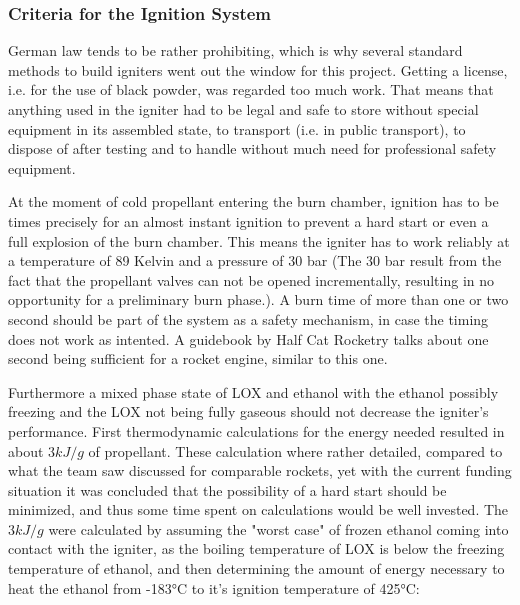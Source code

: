        \subsubsection{Criteria for the Ignition System}
        German law tends to be rather prohibiting, which is why several standard methods to build igniters went out the window for this project. Getting a license, i.e. for the use of black powder, was regarded too much work. %
        That means that anything used in the igniter had to be legal and safe to store without special equipment in its assembled state, to transport (i.e. in public transport), to dispose of after testing and to handle without much need for professional safety equipment. \par
        At the moment of cold propellant entering the burn chamber, ignition has to be times precisely for an almost instant ignition to prevent a hard start or even a full explosion of the burn chamber. This means the igniter has to work reliably at a temperature of 89 Kelvin and a pressure of 30 bar (The 30 bar result from the fact that the propellant valves can not be opened incrementally, resulting in no opportunity for a preliminary burn phase.). A burn time of more than one or two second should be part of the system as a safety mechanism, in case the timing does not work as intented. A guidebook by Half Cat Rocketry talks about one second being sufficient for a rocket engine, similar to this one. \cite[63]{mojave_sphinx}\par
        Furthermore a mixed phase state of LOX and ethanol with the ethanol possibly freezing and the LOX not being fully gaseous should not decrease the igniter’s performance. First thermodynamic calculations for the energy needed resulted in about $3 kJ/g$ of propellant. These calculation where rather detailed, compared to what the team saw discussed for comparable rockets, yet with the current funding situation it was concluded that the possibility of a hard start should be minimized, and thus some time spent on calculations would be well invested. The $3 kJ/g$ were calculated by assuming the "worst case" of frozen ethanol coming into contact with the igniter, as the boiling temperature of LOX is below the freezing temperature of ethanol, and then determining the amount of energy necessary to heat the ethanol from -183°C to it's ignition temperature of 425°C: 
      
